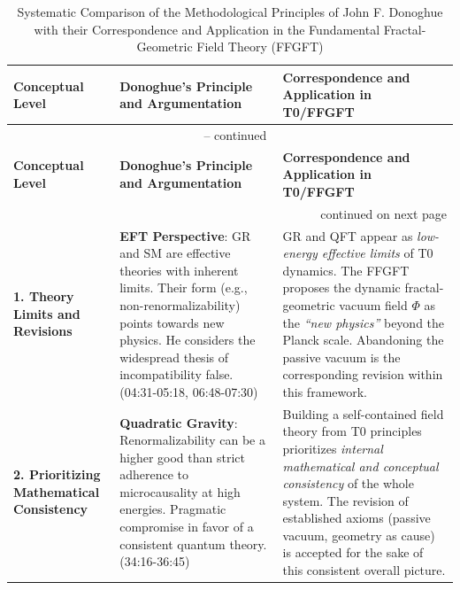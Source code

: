 	\begin{longtable}{p{} p{} p{}}
		\caption{Systematic Comparison of the Methodological Principles of John F. Donoghue with their Correspondence and Application in the Fundamental Fractal-Geometric Field Theory (FFGFT)} \\
		\toprule
		\textbf{Conceptual Level} & \textbf{Donoghue's Principle and Argumentation} & \textbf{Correspondence and Application in T0/FFGFT} \\
		\midrule
		\endfirsthead
		
		\multicolumn{3}{c}{{\tablename\ \thetable{} -- continued}} \\
		\toprule
		\textbf{Conceptual Level} & \textbf{Donoghue's Principle and Argumentation} & \textbf{Correspondence and Application in T0/FFGFT} \\
		\midrule
		\endhead
		
		\midrule \multicolumn{3}{r}{{continued on next page}} \\
		\endfoot
		
		\bottomrule
		\endlastfoot
		\textbf{1. Theory Limits and Revisions} & 
		\textbf{EFT Perspective}: GR and SM are effective theories with inherent limits. Their form (e.g., non-renormalizability) points towards new physics. He considers the widespread thesis of incompatibility false. \cite{DonoghueInterview2025} (04:31-05:18, 06:48-07:30) & 
		GR and QFT appear as \emph{low-energy effective limits} of T0 dynamics. The FFGFT proposes the dynamic fractal-geometric vacuum field $\Phi$ as the \emph{``new physics''} beyond the Planck scale. Abandoning the passive vacuum is the corresponding revision within this framework. \\
		\midrule
		
		\textbf{2. Prioritizing Mathematical Consistency} & 
		\textbf{Quadratic Gravity}: Renormalizability can be a higher good than strict adherence to microcausality at high energies. Pragmatic compromise in favor of a consistent quantum theory. \cite{DonoghueInterview2025} (34:16-36:45) & 
		Building a self-contained field theory from T0 principles prioritizes \emph{internal mathematical and conceptual consistency} of the whole system. The revision of established axioms (passive vacuum, geometry as cause) is accepted for the sake of this consistent overall picture. \\
		\midrule
		

\end{longtable}
